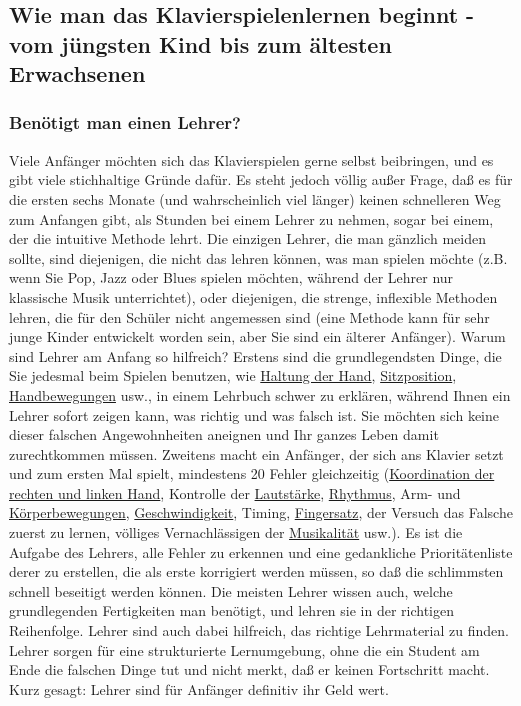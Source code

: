 
\subsection{Wie man das Klavierspielenlernen beginnt - vom jüngsten Kind bis zum ältesten Erwachsenen}
\label{c1iii18}

\subsubsection{Benötigt man einen Lehrer?}
\label{c1iii18a}

Viele Anfänger möchten sich das Klavierspielen gerne selbst beibringen, und es gibt viele stichhaltige Gründe dafür.
Es steht jedoch völlig außer Frage, daß es für die ersten sechs Monate (und wahrscheinlich viel länger) keinen schnelleren Weg zum Anfangen gibt, als Stunden bei einem Lehrer zu nehmen, sogar bei einem, der die intuitive Methode lehrt.
Die einzigen Lehrer, die man gänzlich meiden sollte, sind diejenigen, die nicht das lehren können, was man spielen möchte (z.B. wenn Sie Pop, Jazz oder Blues spielen möchten, während der Lehrer nur klassische Musik unterrichtet), oder diejenigen, die strenge, inflexible Methoden lehren, die für den Schüler nicht angemessen sind (eine Methode kann für sehr junge Kinder entwickelt worden sein, aber Sie sind ein älterer Anfänger).
Warum sind Lehrer am Anfang so hilfreich?
Erstens sind die grundlegendsten Dinge, die Sie jedesmal beim Spielen benutzen, wie \hyperref[c1ii2]{Haltung der Hand}, \hyperref[c1ii3]{Sitzposition}, \hyperref[c1iii4]{Handbewegungen} usw., in einem Lehrbuch schwer zu erklären, während Ihnen ein Lehrer sofort zeigen kann, was richtig und was falsch ist.
Sie möchten sich keine dieser falschen Angewohnheiten aneignen und Ihr ganzes Leben damit zurechtkommen müssen.
Zweitens macht ein Anfänger, der sich ans Klavier setzt und zum ersten Mal spielt, mindestens 20 Fehler gleichzeitig (\hyperref[c1ii25]{Koordination der rechten und linken Hand}, Kontrolle der \hyperref[c1iii14d]{Lautstärke}, \hyperref[c1iii1b]{Rhythmus}, Arm- und \hyperref[c1iii4c]{Körperbewegungen}, \hyperref[c1ii13]{Geschwindigkeit}, Timing, \hyperref[c1ii18]{Fingersatz}, der Versuch das Falsche zuerst zu lernen, völliges Vernachlässigen der \hyperref[c1iii14d]{Musikalität} usw.).
Es ist die Aufgabe des Lehrers, alle Fehler zu erkennen und eine gedankliche Prioritätenliste derer zu erstellen, die als erste korrigiert werden müssen, so daß die schlimmsten schnell beseitigt werden können.
Die meisten Lehrer wissen auch, welche grundlegenden Fertigkeiten man benötigt, und lehren sie in der richtigen Reihenfolge.
Lehrer sind auch dabei hilfreich, das richtige Lehrmaterial zu finden.
Lehrer sorgen für eine strukturierte Lernumgebung, ohne die ein Student am Ende die falschen Dinge tut und nicht merkt, daß er keinen Fortschritt macht.
Kurz gesagt: Lehrer sind für Anfänger definitiv ihr Geld wert.



